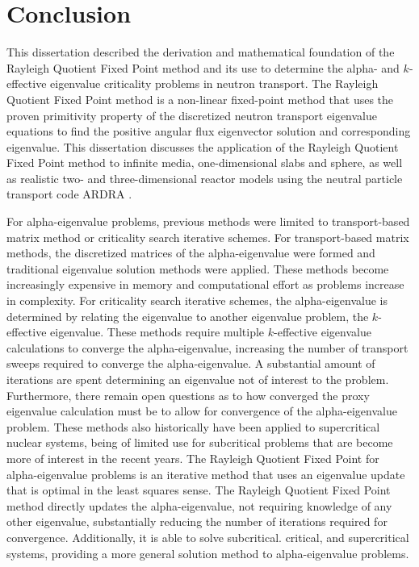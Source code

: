 \chapter{Conclusion}
\label{ch:Conc}

This dissertation described the derivation and mathematical foundation of the Rayleigh Quotient Fixed Point method and its use to determine the alpha- and $k$-effective eigenvalue criticality problems in neutron transport. The Rayleigh Quotient Fixed Point method is a non-linear fixed-point method that uses the proven primitivity property of the discretized neutron transport eigenvalue equations to find the positive angular flux eigenvector solution and corresponding eigenvalue. This dissertation discusses the application of the Rayleigh Quotient Fixed Point method to infinite media, one-dimensional slabs and sphere, as well as realistic two- and three-dimensional reactor models using the neutral particle transport code ARDRA \cite{hanebutte_ardra_1999}.

For alpha-eigenvalue problems, previous methods were limited to transport-based matrix method or criticality search iterative schemes. For transport-based matrix methods, the discretized matrices of the alpha-eigenvalue were formed and traditional eigenvalue solution methods were applied. These methods become increasingly expensive in memory and computational effort as problems increase in complexity. For criticality search iterative schemes, the alpha-eigenvalue is determined by relating the eigenvalue to another eigenvalue problem, the $k$-effective eigenvalue. These methods require multiple $k$-effective eigenvalue calculations to converge the alpha-eigenvalue, increasing the number of transport sweeps required to converge the alpha-eigenvalue. A substantial amount of iterations are spent determining an eigenvalue not of interest to the problem. Furthermore, there remain open questions as to how converged the proxy eigenvalue calculation must be to allow for convergence of the alpha-eigenvalue problem. These methods also historically have been applied to supercritical nuclear systems, being of limited use for subcritical problems that are become more of interest in the recent years. The Rayleigh Quotient Fixed Point for alpha-eigenvalue problems is an iterative method that uses an eigenvalue update that is optimal in the least squares sense. The Rayleigh Quotient Fixed Point method directly updates the alpha-eigenvalue, not requiring knowledge of any other eigenvalue, substantially reducing the number of iterations required for convergence. Additionally, it is able to solve subcritical. critical, and supercritical systems, providing a more general solution method to alpha-eigenvalue problems.

